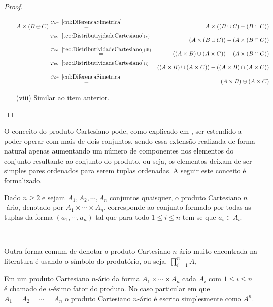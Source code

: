 \begin{proof}
\begin{itemize}
		\begin{eqnarray*}
			A \times (B \ominus C) & \stackrel{Cor. \ \ref{col:DiferencaSimetrica}}{=} & A \times ((B \cup C) - (B \cap C))\\
			& \stackrel{Teo. \ \ref{teo:DistributividadeCartesiano}(\text{v})}{=} & (A \times (B \cup C)) - (A \times (B \cap C))\\
			& \stackrel{Teo. \ \ref{teo:DistributividadeCartesiano}(\text{iii})}{=} & ((A \times B) \cup (A \times C)) - (A \times (B \cap C))\\
			& \stackrel{Teo. \ \ref{teo:DistributividadeCartesiano}(\text{i})}{=} & ((A \times B) \cup (A \times C)) - ((A \times B) \cap (A \times C))\\
			& \stackrel{Cor. \ \ref{col:DiferencaSimetrica}}{=} & (A \times B) \ominus (A \times C)
		\end{eqnarray*}
		\item[(viii)] Similar ao item anterior.
	\end{itemize}
\end{proof}


O conceito do produto Cartesiano pode, como explicado em \cite{lipschutz1978-TC, lipschutz2013-MD}, ser estendido a poder operar com mais de dois conjuntos, sendo essa extensão realizada de forma natural apenas aumentando um número de componentes nos elementos do conjunto resultante ao conjunto do produto, ou seja, os elementos deixam de ser simples pares ordenados para serem tuplas ordenadas. A seguir este conceito é formalizado.

\begin{definition}
	Dado $n \geq 2$ e sejam $A_1, A_2, \cdots, A_n$ conjuntos quaisquer, o produto Cartesiano $n$-ário, denotado por $A_1 \times \cdots \times A_n$, corresponde ao conjunto formado por todas as tuplas da forma $(a_1, \cdots, a_n)$ tal que para todo $1 \leq i \leq n$ tem-se que $a_i \in A_i$.
\end{definition}

\

\begin{rema}
	Outra forma comum de denotar o produto Cartesiano $n$-ário muito encontrada na literatura é usando o símbolo do produtório, ou seja, $\displaystyle\prod_{i = 1}^{n} A_i$ 
\end{rema}

Em um produto Cartesiano $n$-ário da forma $A_1 \times \cdots \times A_n$ cada $A_i$ com $1 \leq i \leq n$ é chamado de $i$-ésimo fator do produto. No caso particular em que $A_1 = A_2 = \cdots = A_n$ o produto Cartesiano $n$-ário é escrito simplesmente como $A^n$.

